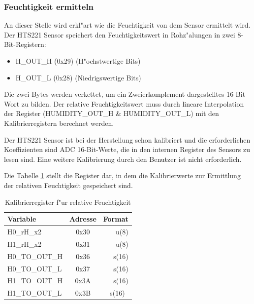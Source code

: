\subsubsection{Feuchtigkeit ermitteln}

An dieser Stelle wird erkl"art wie die Feuchtigkeit von dem Sensor ermittelt wird.
Der HTS221 Sensor speichert den Feuchtigkeitswert in Rohz"alungen in zwei 8-Bit-Registern:
\begin{itemize}
	\item H\_OUT\_H (0x29) (H"ochstwertige Bits)
	\item H\_OUT\_L (0x28) (Niedrigswertige Bits)
\end{itemize}

Die zwei Bytes werden verkettet, um ein Zweierkomplement dargestelltes 16-Bit Wort zu bilden. Der relative Feuchtigkeitswert muss durch lineare Interpolation
der Register (HUMIDITY\_OUT\_H \& HUMIDITY\_OUT\_L) mit den Kalibrierregistern berechnet werden.

Der HTS221 Sensor ist bei der Herstellung schon kalibriert und die erforderlichen Koeffizienten sind ADC 16-Bit-Werte, die in den internen Register des Sensors zu lesen sind. Eine weitere Kalibrierung durch den Benutzer ist nicht erforderlich.

Die Tabelle \ref{tab:Reg_H} stellt die Register dar, in dem die Kalibrierwerte zur Ermittlung der relativen Feuchtigkeit gespeichert sind.

\begin{center}
	\begin{table}[htbp] 
		\centering 
		\Large
		\begin{tabular}{l|c|r}
			\textbf{Variable} & 	\textbf{Adresse} & \textbf{Format}\footnotemark\\
			\hline
			H0\_rH\_x2	& 0x30	& u(8) \\
			\hline
			H1\_rH\_x2	& 0x31	& u(8)\\
			\hline
			H0\_TO\_OUT\_H & 0x36	& s(16)\\
			\hline
			H0\_TO\_OUT\_L 	& 0x37  & s(16)\\
			\hline
			H1\_TO\_OUT\_H	& 0x3A	& s(16)\\
			\hline
			H1\_TO\_OUT\_L 	& 0x3B  & s(16)\
		\end{tabular} 
		\caption{Kalibrierregister f"ur relative Feuchtigkeit} 
		\label{tab:Reg_H} 
		 
	\end{table}
\end{center}

